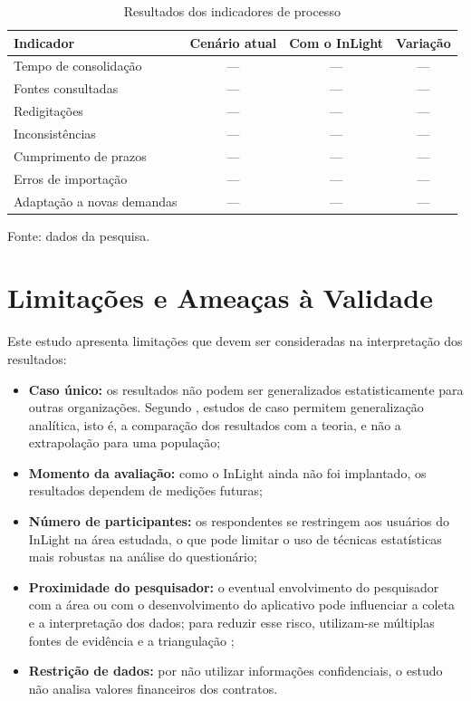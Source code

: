 \begin{table}[H]
\centering
\caption{Resultados dos indicadores de processo}
\label{tab:resultados}
\footnotesize
\begin{tabularx}{\textwidth}{Xccc}
\toprule
\textbf{Indicador} & \textbf{Cenário atual} & \textbf{Com o InLight} & \textbf{Variação} \\ \midrule
Tempo de consolidação & --- & --- & --- \\ \midrule
Fontes consultadas & --- & --- & --- \\ \midrule
Redigitações & --- & --- & --- \\ \midrule
Inconsistências & --- & --- & --- \\ \midrule
Cumprimento de prazos & --- & --- & --- \\ \midrule
Erros de importação & --- & --- & --- \\ \midrule
Adaptação a novas demandas & --- & --- & --- \\ \bottomrule
\end{tabularx}

\vspace{0.2cm}
{\footnotesize Fonte: dados da pesquisa.}
\end{table}

\section{Limitações e Ameaças à Validade}
\label{sec:limitacoes}

Este estudo apresenta limitações que devem ser consideradas na interpretação dos resultados:

\begin{itemize}
    \item \textbf{Caso único:} os resultados não podem ser generalizados estatisticamente para outras organizações. Segundo \citet{yin2015}, estudos de caso permitem generalização analítica, isto é, a comparação dos resultados com a teoria, e não a extrapolação para uma população;
    \item \textbf{Momento da avaliação:} como o InLight ainda não foi implantado, os resultados dependem de medições futuras;
    \item \textbf{Número de participantes:} os respondentes se restringem aos usuários do InLight na área estudada, o que pode limitar o uso de técnicas estatísticas mais robustas na análise do questionário;
    \item \textbf{Proximidade do pesquisador:} o eventual envolvimento do pesquisador com a área ou com o desenvolvimento do aplicativo pode influenciar a coleta e a interpretação dos dados; para reduzir esse risco, utilizam-se múltiplas fontes de evidência e a triangulação \citep{yin2015};
    \item \textbf{Restrição de dados:} por não utilizar informações confidenciais, o estudo não analisa valores financeiros dos contratos.
\end{itemize}